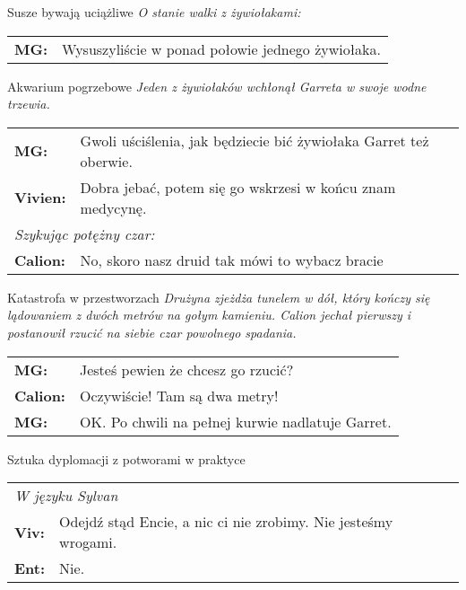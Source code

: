 \documentclass[10pt,twoside,twocolumn]{book}
\begin{document}
\begin{rpg-quotebox}{Susze bywają uciążliwe}
   \textit{O stanie walki z żywiołakami:}\\
   
   \begin{tabularx}{\columnwidth}{lX}
      \textbf{MG:} & Wysuszyliście w ponad połowie jednego żywiołaka.\\
   \end{tabularx}
\end{rpg-quotebox}

\begin{rpg-quotebox}{Akwarium pogrzebowe}
   \textit{Jeden z żywiołaków wchłonął Garreta w swoje wodne trzewia.}\\
   
   \begin{tabularx}{\columnwidth}{lX}
      \textbf{MG:} & Gwoli uściślenia, jak będziecie bić żywiołaka Garret też oberwie.\\
      \textbf{Vivien:} & Dobra jebać, potem się go wskrzesi w końcu znam medycynę.\\
      \multicolumn{2}{l}{\textit{Szykując potężny czar:}}\\
      \textbf{Calion:} & No, skoro nasz druid tak mówi to wybacz bracie\\
   \end{tabularx}
\end{rpg-quotebox}

\begin{rpg-quotebox}{Katastrofa w przestworzach}
   \textit{Drużyna zjeżdża tunelem w dół, który kończy się lądowaniem z dwóch metrów na gołym kamieniu. Calion jechał pierwszy i postanowił rzucić na siebie czar powolnego spadania.}\\
   
   \begin{tabularx}{\columnwidth}{lX}
      \textbf{MG:} & Jesteś pewien że chcesz go rzucić?\\
      \textbf{Calion:} & Oczywiście! Tam są dwa metry!\\
      \textbf{MG:} & OK. Po chwili na pełnej kurwie nadlatuje Garret.\\
   \end{tabularx}
\end{rpg-quotebox}

\begin{rpg-quotebox}{Sztuka dyplomacji z potworami w praktyce}
   \begin{tabularx}{\columnwidth}{lX}
      \multicolumn{2}{l}{\textit{W języku Sylvan}}\\
      \textbf{Viv:} & Odejdź stąd Encie, a nic ci nie zrobimy. Nie jesteśmy wrogami.\\
      \textbf{Ent:} & Nie.\\
   \end{tabularx}
\end{rpg-quotebox}
\end{document}
